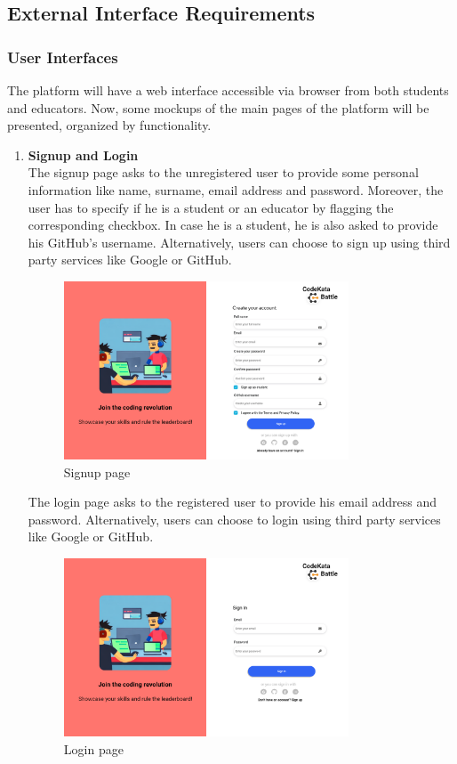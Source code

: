 \subsection{External Interface Requirements}
\subsubsection{User Interfaces}
The platform will have a web interface accessible via browser from both students and educators. 
Now, some mockups of the main pages of the platform will be presented, organized by functionality.

\begin{enumerate}[label=\textbf{F\arabic*)}]
    \item \textbf{Signup and Login}\\
    The signup page asks to the unregistered user to provide some personal information like name, surname, email address and password. Moreover, the user has to specify if he is a student or an educator by flagging the corresponding checkbox. In case he is a student, he is also asked to provide his GitHub's username. Alternatively, users can choose to sign up using third party services like Google or GitHub.\\
    \begin{figure}[H]
        \centering
        \includegraphics[width=0.8\textwidth]{Mockups/1_signup.png}
        \caption{Signup page}
    \end{figure}
    The login page asks to the registered user to provide his email address and password. Alternatively, users can choose to login using third party services like Google or GitHub.\\
    \begin{figure}[H]
        \centering
        \includegraphics[width=0.8\textwidth]{Mockups/2_login.png}
        \caption{Login page}
    \end{figure}


\end{enumerate}
